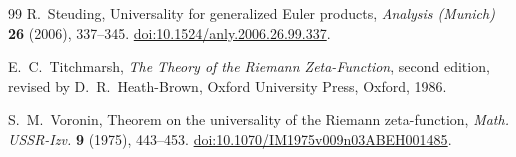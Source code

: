 \documentclass[11pt]{article}
\begin{document}
\begin{thebibliography}{99}
R.~Steuding,
\newblock Universality for generalized Euler products,
\newblock \emph{Analysis (Munich)} \textbf{26} (2006), 337--345.
\newblock \href{https://doi.org/10.1524/anly.2006.26.99.337}
{doi:10.1524/anly.2006.26.99.337}.

E.~C.~Titchmarsh,
\newblock \emph{The Theory of the Riemann Zeta-Function},
\newblock second edition, revised by D.~R.~Heath-Brown, Oxford University
Press, Oxford, 1986.

S.~M.~Voronin,
\newblock Theorem on the universality of the Riemann zeta-function,
\newblock \emph{Math. USSR-Izv.} \textbf{9} (1975), 443--453.
\newblock \href{https://doi.org/10.1070/IM1975v009n03ABEH001485}
{doi:10.1070/IM1975v009n03ABEH001485}.

\end{thebibliography}
\end{document}
